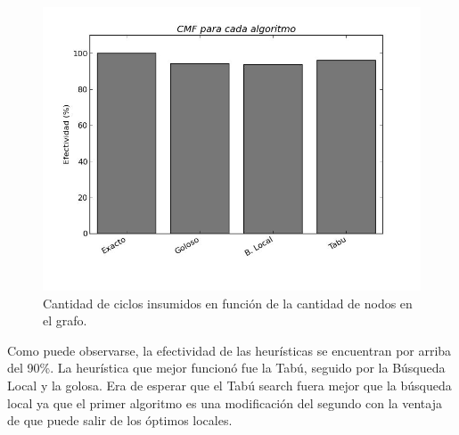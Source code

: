\begin{figure}[H]
\centering\includegraphics[width=11 cm]{experimentacion/efectividad.jpg}
\caption{Cantidad de ciclos insumidos en función de la cantidad de nodos en el grafo.}
\end{figure}

Como puede observarse, la efectividad de las heurísticas se encuentran por arriba del 90\%. La heurística que mejor funcionó fue la Tabú, seguido por la Búsqueda Local y la golosa. Era de esperar que el Tabú search fuera mejor que la búsqueda local ya que el primer algoritmo es una modificación del segundo con la ventaja de que puede salir de los óptimos locales. 






